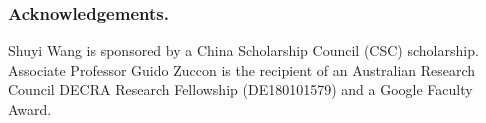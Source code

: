 \documentclass[runningheads]{llncs}
\begin{document}







\makeatletter
\renewcommand{\@biblabel}[1]{\hfill #1.}
\makeatother

\subsubsection*{Acknowledgements.} Shuyi Wang is sponsored by a China Scholarship Council (CSC) scholarship. Associate Professor Guido Zuccon is the recipient of an Australian Research Council DECRA Research Fellowship (DE180101579) and a Google Faculty Award. 



\end{document}
